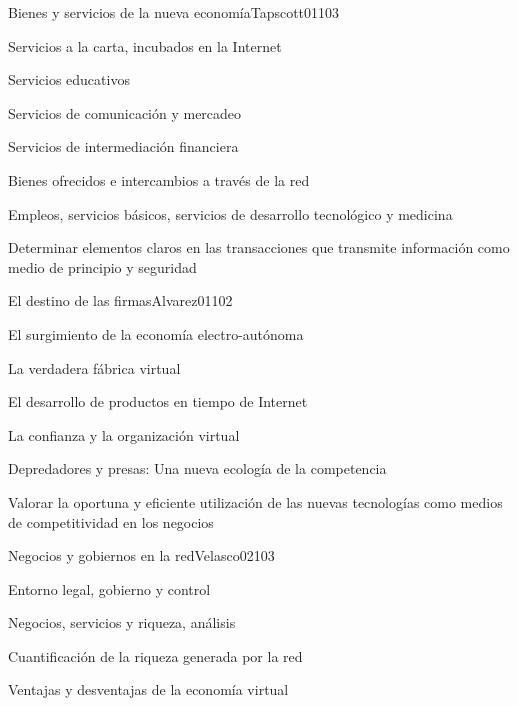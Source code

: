 \begin{syllabus}
\begin{unit}{Bienes y servicios de la nueva economía}{Tapscott01}{10}{3}
   \begin{topics}
      \item Servicios a la carta, incubados en la Internet
	\item Servicios educativos
	\item Servicios de comunicación y mercadeo
	\item Servicios de intermediación financiera
	\item Bienes ofrecidos e intercambios a través de la red
	\item Empleos, servicios básicos, servicios de desarrollo tecnológico y medicina
   \end{topics}

   \begin{unitgoals}
      \item Determinar elementos claros en las transacciones que transmite información como medio de principio y seguridad
   \end{unitgoals}
\end{unit}

\begin{unit}{El destino de las firmas}{Alvarez01}{10}{2}
   \begin{topics}
      \item El surgimiento de la economía electro-autónoma
	\item La verdadera fábrica virtual
	\item El desarrollo de productos en tiempo de Internet
	\item La confianza y la organización virtual
	\item Depredadores y presas: Una nueva ecología de la competencia
   \end{topics}

   \begin{unitgoals}
      \item Valorar la oportuna y eficiente utilización de las nuevas tecnologías como medios de competitividad en los negocios
   \end{unitgoals}
\end{unit}

\begin{unit}{Negocios y gobiernos en la red}{Velasco02}{10}{3}
   \begin{topics}
      \item Entorno legal, gobierno y control
	\item Negocios, servicios y riqueza, análisis
	\item Cuantificación de la riqueza generada por la red
	\item Ventajas y desventajas de la economía virtual
   \end{topics}


\end{unit}
\end{syllabus}

